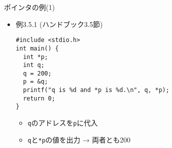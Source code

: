 \begin{frame}[t,fragile]{ポインタの例(1)}
  \begin{itemize}
    \setlength{\itemsep}{1em}
  \item 例3.5.1 (ハンドブック3.5節)
\begin{lstlisting}
#include <stdio.h>
int main() {
  int *p;
  int q;
  q = 200;
  p = &q;
  printf("q is %d and *p is %d.\n", q, *p);
  return 0;
}
\end{lstlisting}
\begin{itemize}
\item \verb+q+のアドレスを\verb+p+に代入
\item \verb+q+と\verb+*p+の値を出力 → 両者とも200
\end{itemize}
  \end{itemize}
\end{frame}
